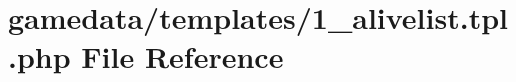 \hypertarget{1__alivelist_8tpl_8php}{\section{gamedata/templates/1\+\_\+alivelist.tpl.\+php File Reference}
\label{1__alivelist_8tpl_8php}
}
